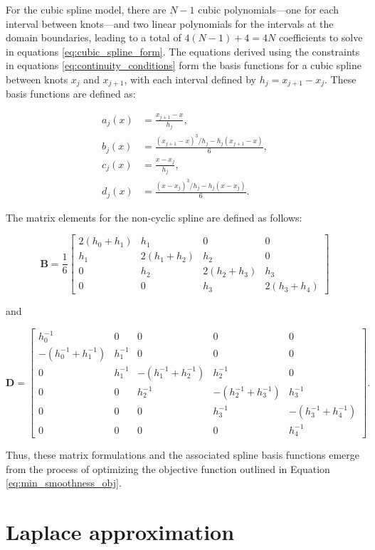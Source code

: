 \documentclass[
11pt, %
oneside, %
english, %
singlespacing, %
]{macthesis} %
\begin{document}
For the cubic spline model, there are \(N-1\) cubic polynomials---one for each interval between knots---and two linear polynomials for the intervals at the domain boundaries, leading to a total of \(4(N-1) + 4 = 4N\) coefficients to solve in equations \ref{eq:cubic_spline_form}. The equations derived using the constraints in equations \ref{eq:continuity_conditions} form the basis functions for a cubic spline between knots \(x_j\) and \(x_{j+1}\), with each interval defined by \(h_j = x_{j+1} - x_j\). These basis functions are defined as:

\[
\begin{aligned}
a_{j}(x) &= \frac{x_{j+1} - x}{h_j}, \\
b_{j}(x) &= \frac{(x_{j+1} - x)^3 / h_j - h_j (x_{j+1} - x)}{6}, \\
c_{j}(x) &= \frac{x - x_j}{h_j}, \\
d_{j}(x) &= \frac{(x - x_j)^3 / h_j - h_j (x - x_j)}{6}.
\end{aligned}
\label{eq:spline basis functions}
\]

The matrix elements for the non-cyclic spline are defined as follows:

\[
\mathbf{B} =
\frac{1}{6} 
\begin{bmatrix}
2(h_0 + h_1) & h_1 & 0 & 0 \\
h_1 & 2(h_1 + h_2) & h_2 & 0 \\
0 & h_2 & 2(h_2 + h_3) & h_3 \\
0 & 0 & h_3 & 2(h_3 + h_4)
\end{bmatrix}
\]

and

\[
\mathbf{D} =
\begin{bmatrix}
h^{-1}_0 & 0 & 0 & 0 & 0 \\
-(h^{-1}_0 + h^{-1}_1) & h^{-1}_1 & 0 & 0 & 0 \\
0 & h^{-1}_1 & -(h^{-1}_1 + h^{-1}_2) & h^{-1}_2 & 0 \\
0 & 0 & h^{-1}_2 & -(h^{-1}_2 + h^{-1}_3) & h^{-1}_3 \\
0 & 0 & 0 & h^{-1}_3 & -(h^{-1}_3 + h^{-1}_4) \\
0 & 0 & 0 & 0 & h^{-1}_4
\end{bmatrix}.
\]

Thus, these matrix formulations and the associated spline basis functions emerge from the process of optimizing the objective function outlined in Equation \ref{eq:min_smoothness_obj}.

\section{Laplace approximation}\label{Laplace-approximation}
\end{document}
